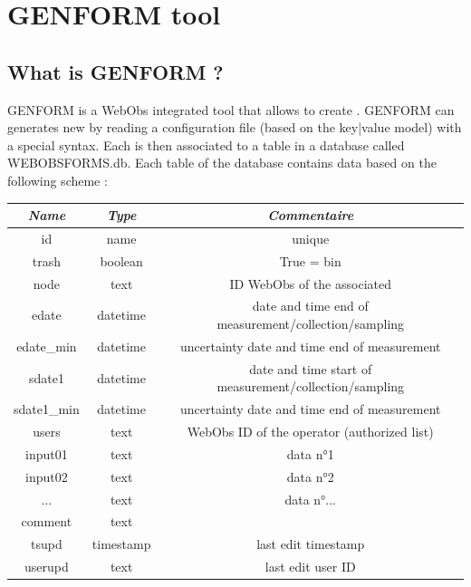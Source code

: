 
\chapter{GENFORM tool} \label{metadata}



\section{What is GENFORM ?} \label{genform}

GENFORM is a WebObs integrated tool that allows to create . GENFORM can generates new  by reading a configuration file (based on the key|value model) with a special syntax. Each  is then associated to a table in a database called WEBOBSFORMS.db. Each table of the database contains data based on the following scheme :

\begin{center}
	\begin{tabular}{c c c}
		\hline
		\textit{Name} & \textit{Type} & \textit{Commentaire} \\
		\hline
		id & name & unique \\
		trash & boolean & True = bin	\\
		node & text & ID WebObs of the associated \wo{node} \\
		edate & datetime & date and time end of measurement/collection/sampling \\
		edate_min & datetime & uncertainty date and time end of measurement \\
		sdate1 & datetime & date and time start of measurement/collection/sampling \\
		sdate1_min & datetime & uncertainty date and time end of measurement \\
		users & text & WebObs ID of the operator (authorized list) \\
		input01 & text & data n°1 \\
		input02 & text & data n°2 \\
		... & text & data n°... \\
		comment & text \\
		tsupd & timestamp & last edit timestamp \\
		userupd & text & last edit user ID \\
		\hline
	\end{tabular}
\end{center}

